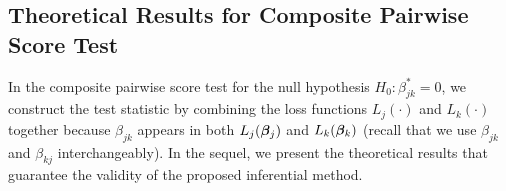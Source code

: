\documentclass[twoside,11pt]{article}
\newcommand*{\bbetas}{\bbeta^*}
\begin{document}
\subsection{Theoretical Results for Composite Pairwise Score Test}\label{subsec::score}
In the composite pairwise score test for the null hypothesis $H_0: \beta_{jk}^*\! =\! 0$,  we construct the test statistic by combining the loss functions $L_j(\cdot)$ and $L_{k}(\cdot)$ together because $\beta_{jk}$ appears in both $L_j(\bm{\beta}_j)$ and $L_k(\bm{\beta}_k)$ (recall that we use $\beta_{jk}$ and $\beta_{kj}$ interchangeably). 
In the sequel, we present the theoretical results that guarantee the validity of the proposed inferential method.
 

\end{document}
